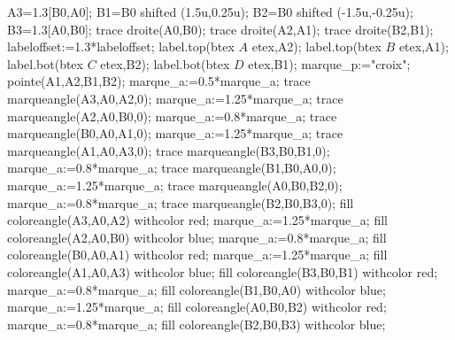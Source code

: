 \begin{corrige}
\begin{enumerate}
\begin{Geometrie}[CoinHD={(5.5u,3u)}]
         A3=1.3[B0,A0];
         B1=B0 shifted (1.5u,0.25u);
         B2=B0 shifted (-1.5u,-0.25u);
         B3=1.3[A0,B0];
         trace droite(A0,B0);
         trace droite(A2,A1);
         trace droite(B2,B1);
         labeloffset:=1.3*labeloffset;
         label.top(btex $A$ etex,A2);
         label.top(btex $B$ etex,A1);
         label.bot(btex $C$ etex,B2);
         label.bot(btex $D$ etex,B1);         
         marque_p:="croix";
         pointe(A1,A2,B1,B2);
         marque_a:=0.5*marque_a;
         trace marqueangle(A3,A0,A2,0);
         marque_a:=1.25*marque_a;
         trace marqueangle(A2,A0,B0,0);
         marque_a:=0.8*marque_a;
         trace marqueangle(B0,A0,A1,0);
         marque_a:=1.25*marque_a;
         trace marqueangle(A1,A0,A3,0);
         trace marqueangle(B3,B0,B1,0);
         marque_a:=0.8*marque_a;
         trace marqueangle(B1,B0,A0,0);
         marque_a:=1.25*marque_a;
         trace marqueangle(A0,B0,B2,0);
         marque_a:=0.8*marque_a;
         trace marqueangle(B2,B0,B3,0);
         fill coloreangle(A3,A0,A2) withcolor red;
         marque_a:=1.25*marque_a;
         fill coloreangle(A2,A0,B0) withcolor blue;
         marque_a:=0.8*marque_a;
         fill coloreangle(B0,A0,A1) withcolor red;
         marque_a:=1.25*marque_a;
         fill coloreangle(A1,A0,A3) withcolor blue;
         fill coloreangle(B3,B0,B1) withcolor red;
         marque_a:=0.8*marque_a;
         fill coloreangle(B1,B0,A0) withcolor blue;
         marque_a:=1.25*marque_a;
         fill coloreangle(A0,B0,B2) withcolor red;
         marque_a:=0.8*marque_a;
         fill coloreangle(B2,B0,B3) withcolor blue;
      \end{Geometrie}
   \end{enumerate}
 \end{corrige}